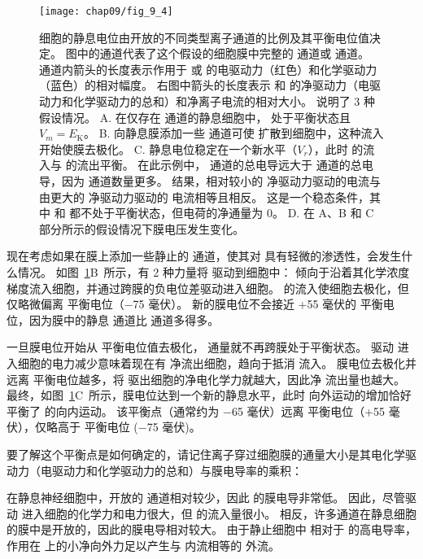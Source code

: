 \begin{figure}[htbp]
	\centering
	\texttt{[image: chap09/fig\_9\_4]}
	\caption{细胞的静息电位由开放的不同类型离子通道的比例及其平衡电位值决定。
		图中的通道代表了这个假设的细胞膜中完整的  通道或  通道。
		通道内箭头的长度表示作用于  或  的电驱动力（红色）和化学驱动力（蓝色）的相对幅度。
		右图中箭头的长度表示  和  的净驱动力（电驱动力和化学驱动力的总和）和净离子电流的相对大小。
		说明了 3 种假设情况。
		A. 在仅存在  通道的静息细胞中， 处于平衡状态且 $V_m = E_\text{K}$。
		B. 向静息膜添加一些  通道可使  扩散到细胞中，这种流入开始使膜去极化。
		C. 静息电位稳定在一个新水平（$V_r$），此时  的流入与  的流出平衡。
		在此示例中， 通道的总电导远大于  通道的总电导，因为  通道数量更多。
		结果，相对较小的  净驱动力驱动的电流与由更大的  净驱动力驱动的  电流相等且相反。
		这是一个稳态条件，其中  和  都不处于平衡状态，但电荷的净通量为 0。
		D. 在 A、B 和 C 部分所示的假设情况下膜电压发生变化。}
	\label{fig:9_4}
\end{figure}


现在考虑如果在膜上添加一些静止的  通道，使其对  具有轻微的渗透性，会发生什么情况。
如图~\ref{fig:9_4}B~所示，有 2 种力量将  驱动到细胞中：
 倾向于沿着其化学浓度梯度流入细胞，并通过跨膜的负电位差驱动进入细胞。
 的流入使细胞去极化，但仅略微偏离  平衡电位（−75 毫伏）。
新的膜电位不会接近 +55 毫伏的  平衡电位，因为膜中的静息  通道比  通道多得多。


一旦膜电位开始从  平衡电位值去极化， 通量就不再跨膜处于平衡状态。
驱动  进入细胞的电力减少意味着现在有  净流出细胞，趋向于抵消  流入。
膜电位去极化并远离  平衡电位越多，将  驱出细胞的净电化学力就越大，因此净  流出量也越大。
最终，如图~\ref{fig:9_4}C~所示，膜电位达到一个新的静息水平，此时  向外运动的增加恰好平衡了  的向内运动。
该平衡点（通常约为 −65 毫伏）远离  平衡电位（+55 毫伏），仅略高于  平衡电位 (−75 毫伏)。


要了解这个平衡点是如何确定的，请记住离子穿过细胞膜的通量大小是其电化学驱动力（电驱动力和化学驱动力的总和）与膜电导率的乘积：


在静息神经细胞中，开放的  通道相对较少，因此  的膜电导非常低。
因此，尽管驱动  进入细胞的化学力和电力很大，但  的流入量很小。
相反，许多通道在静息细胞的膜中是开放的，因此的膜电导相对较大。
由于静止细胞中  相对于  的高电导率，作用在  上的小净向外力足以产生与  内流相等的  外流。



